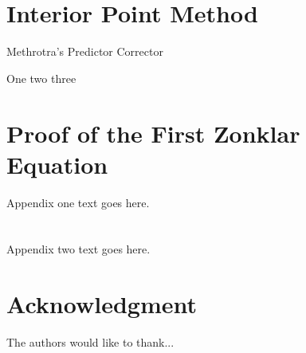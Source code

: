 \documentclass[journal, 10pt, a4paper]{IEEEtran}
\begin{document}
\section{Interior Point Method}
\blindtext
\begin{algorithm}
    \caption{Methrotra's Predictor Corrector}
    \begin{algorithmic}
    \State One two three
    \end{algorithmic}
\end{algorithm}
\begin{example}
\end{example}

\appendices

\section{Proof of the First Zonklar Equation}
Appendix one text goes here.

\section{}
Appendix two text goes here.


\section*{Acknowledgment}


The authors would like to thank...


\end{document}
